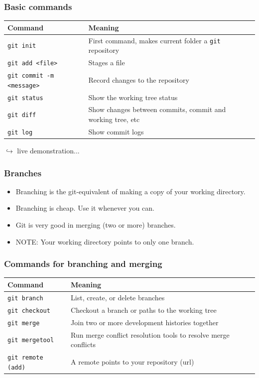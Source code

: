 \documentclass{beamer}
\begin{document}
\begin{frame}
\frametitle{Basic commands}
\begin{table}
\begin{tabularx}{\textwidth}{l|X}
Command & Meaning \\
 \hline
 \texttt{git init} & First command, makes current folder a \texttt{git} repository\\
 \texttt{git add <file>} & Stages a file\\
 \texttt{git commit -m <message>} & Record changes to the repository\\
 \texttt{git status} & Show the working tree status\\
 \texttt{git diff} & Show changes between commits, commit and working tree, etc\\
 \texttt{git log} & Show commit logs\\
\end{tabularx}
\end{table}
\hfill $\hookrightarrow$ live demonstration...
\end{frame}

\begin{frame}
\frametitle{Branches}
\begin{itemize}
 \item Branching is the git-equivalent of making a copy of your working
 directory.
 \item Branching is cheap.  Use it whenever you can.
 \item Git is very good in merging (two or more) branches.
 \item NOTE: Your working directory points to only one branch.
\end{itemize}
\end{frame}

\begin{frame}
\frametitle{Commands for branching and merging}
\begin{table}
\begin{tabularx}{\textwidth}{l|X}
Command & Meaning \\
 \hline
 \texttt{git branch} & List, create, or delete branches\\
 \texttt{git checkout} & Checkout a branch or paths to the working tree\\
 \texttt{git merge} & Join two or more development histories together\\
 \texttt{git mergetool} & Run merge conflict resolution tools to resolve merge conflicts\\
 \texttt{git remote (add)} & A {\color{red}remote} points to your repository (url)\\
\end{tabularx}
\end{table}
\end{frame}
\end{document}
